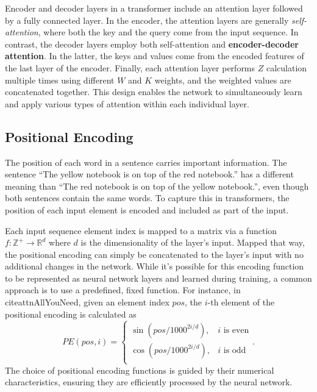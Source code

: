  Encoder and decoder layers in a transformer include an attention layer followed by a fully connected layer. In the encoder, the attention layers are generally \textit{self-attention}, where both the key and the query come from the input sequence. In contrast, the decoder layers employ both self-attention and \textbf{encoder-decoder attention}. In the latter, the keys and values come from the encoded features of the last layer of the encoder. Finally, each attention layer performs $Z$ calculation multiple times using different $W$ and $K$ weights, and the weighted values are concatenated together. This design enables the network to simultaneously learn and apply various types of attention within each individual layer.
 
 \subsection{Positional Encoding}
 
The position of each word in a sentence carries important information. The sentence ``The yellow notebook is on top of the red notebook.'' has a different meaning than ``The red notebook is on top of the yellow notebook.'', even though both sentences contain the same words. To capture this in transformers, the position of each input element is encoded and included as part of the input.
 
Each input sequence element index is mapped to a matrix via a function $f : \mathbb{Z}^{+} \rightarrow \mathbb{R}^d$ where $d$ is the dimensionality of the layer's input. Mapped that way, the positional encoding can simply be concatenated to the layer's input with no additional changes in the network. While it's possible for this encoding function to be represented as neural network layers and learned during training, a common approach is to use a predefined, fixed function. For instance, in cite{attnAllYouNeed}, given an element index $pos$, the $i$-th element of the positional encoding is calculated as
\begin{equation}
PE(pos, i) = \begin{cases}
	\sin(pos/1000^{2i/d}), & \text{$i$ is even}\\
	\cos(pos/1000^{2i/d}), & \text{$i$ is odd}\\
\end{cases}.
\end{equation}
The choice of positional encoding functions is guided by their numerical characteristics, ensuring they are efficiently processed by the neural network.
  
